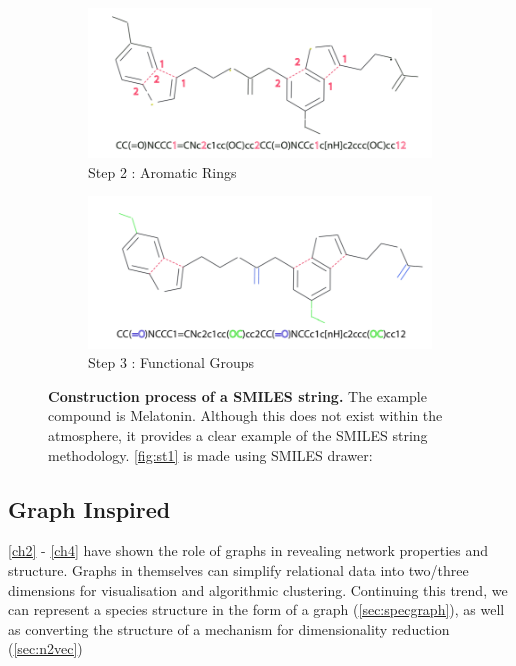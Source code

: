 \begin{figure}[H]
     \begin{subfigure}[b]{0.495\textwidth}
         \centering
         \includegraphics[width=\textwidth]{4fig/sm3.png}
         \caption{Step 2 : Aromatic Rings}
         \label{fig:st3}
     \end{subfigure}
     \hfill
     \begin{subfigure}[b]{0.495\textwidth}
        \centering
            \includegraphics[width=\textwidth]{4fig/sm2.png}
            \caption{Step 3 : Functional Groups }
            \label{fig:st4}
        \end{subfigure}

        \caption{ \textbf{Construction process of a SMILES string.} The example compound is Melatonin. Although this does not exist within the atmosphere, it provides a clear example of the SMILES string methodology. \autoref{fig:st1} is made using SMILES drawer: \citep{SMILESdrawer} }
        \label{fig:SMILES}
\end{figure}


\subsection{Graph Inspired}

\autoref{ch2} - \ref{ch4} have shown the role of graphs in revealing network properties and structure. Graphs in themselves can simplify relational data into two/three dimensions for visualisation and algorithmic clustering. Continuing this trend, we can represent a species structure in the form of a graph (\autoref{sec:specgraph}), as well as converting the structure of a mechanism for dimensionality reduction (\autoref{sec:n2vec})


